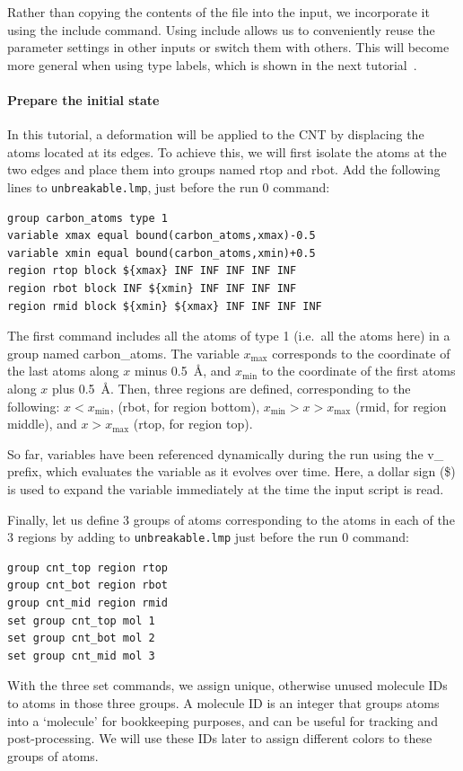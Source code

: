 \documentclass[9pt,tutorial]{livecoms}
\newcommand{\lmpcmd}[1]{\colorbox{listing}{\textcolor{command}{\small{#1}}}} %
\newcommand{\flecmd}[1]{\textcolor{command}{\texttt{#1}}} %
\begin{document}
\begin{note}
Rather than copying the contents of the file into the input, we
incorporate it using the \lmpcmd{include} command.  Using \lmpcmd{include} allows
us to conveniently reuse the parameter settings
in other inputs or switch them with others.  This will become more general
when using type labels, which is shown in the next
tutorial~\cite{gissinger2024type}.
\end{note}

\paragraph{Prepare the initial state}

In this tutorial, a deformation will be applied to the CNT by displacing
the atoms located at its edges.  To achieve this, we will first isolate the
atoms at the two edges and place them into groups named \lmpcmd{rtop} and
\lmpcmd{rbot}.  Add the following lines to \flecmd{unbreakable.lmp},
just before the \lmpcmd{run 0} command:
\begin{lstlisting}
group carbon_atoms type 1
variable xmax equal bound(carbon_atoms,xmax)-0.5
variable xmin equal bound(carbon_atoms,xmin)+0.5
region rtop block ${xmax} INF INF INF INF INF
region rbot block INF ${xmin} INF INF INF INF
region rmid block ${xmin} ${xmax} INF INF INF INF
\end{lstlisting}
The first command includes all the atoms of type 1 (i.e.~all the atoms here)
in a group named \lmpcmd{carbon\_atoms}.
The variable $x_\text{max}$ corresponds to the coordinate of the
last atoms along $x$ minus 0.5~Å, and $x_\text{min}$ to the coordinate
of the first atoms along $x$ plus 0.5~Å.  Then, three regions are defined,
corresponding to the following: $x < x_\text{min}$, (\lmpcmd{rbot}, for region
bottom), $x_\text{min} > x > x_\text{max}$ (\lmpcmd{rmid}, for region middle),
and $x > x_\text{max}$ (\lmpcmd{rtop}, for region top).

\begin{note}
  {\color{blue} So far, variables have been referenced
    dynamically during the run using the \lmpcmd{v\_} prefix, which
    evaluates the variable as it evolves over time.  Here, a dollar sign
    (\$) is used to expand the variable immediately at the time the input
    script is read.}
\end{note}

Finally, let us define 3 groups of atoms corresponding to the atoms
in each of the 3 regions by adding to \flecmd{unbreakable.lmp}
just before the \lmpcmd{run 0} command:
\begin{lstlisting}
group cnt_top region rtop
group cnt_bot region rbot
group cnt_mid region rmid
set group cnt_top mol 1
set group cnt_bot mol 2
set group cnt_mid mol 3
\end{lstlisting}
With the three \lmpcmd{set} commands, we assign unique, otherwise unused molecule
IDs to atoms in those three groups.  {\color{blue}A molecule ID is an
integer that groups atoms into a `molecule' for bookkeeping purposes, and can be
useful for tracking and post-processing.}  We will use these IDs later to assign
different colors to these groups of atoms.
\end{document}
